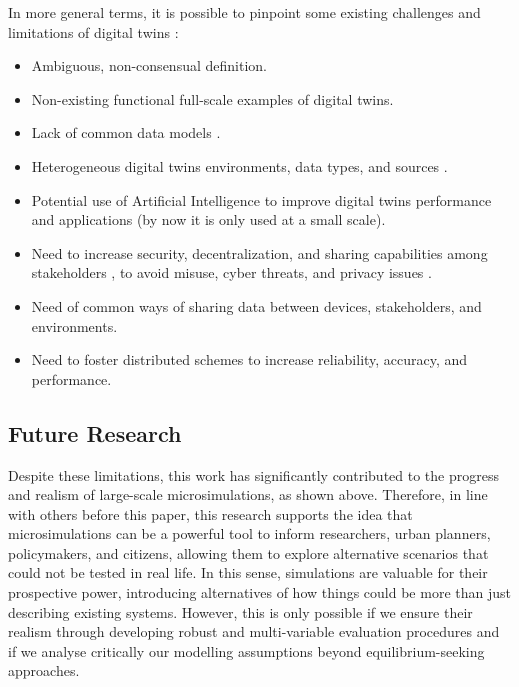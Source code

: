 In more general terms, it is possible to pinpoint some existing challenges and limitations of digital twins \citep{Fuller2020}:
\begin{itemize}
    \item Ambiguous, non-consensual definition.
    \item Non-existing functional full-scale examples of digital twins.
    \item Lack of common data models \citep{Hudson-Smith2022}.
    \item Heterogeneous digital twins environments, data types, and sources \citep{Tao2019}.
    \item Potential use of Artificial Intelligence to improve digital twins performance and applications (by now it is only used at a small scale).
    \item Need to increase security, decentralization, and sharing capabilities among stakeholders \citep{Sepasgozar2021}, to avoid misuse, cyber threats, and privacy issues \citep{Caldarelli2023}.
    \item Need of common ways of sharing data between devices, stakeholders, and environments.
    \item Need to foster distributed schemes to increase reliability, accuracy, and performance.
\end{itemize}

\subsection{Future Research}
Despite these limitations, this work has significantly contributed to the progress and realism of large-scale microsimulations, as shown above. Therefore, in line with others before this paper, this research supports the idea that microsimulations can be a powerful tool to inform researchers, urban planners, policymakers, and citizens, allowing them to explore alternative scenarios that could not be tested in real life. In this sense, simulations are valuable for their prospective power, introducing alternatives of how things could be more than just describing existing systems. However, this is only possible if we ensure their realism through developing robust and multi-variable evaluation procedures and if we analyse critically our modelling assumptions beyond equilibrium-seeking approaches.

